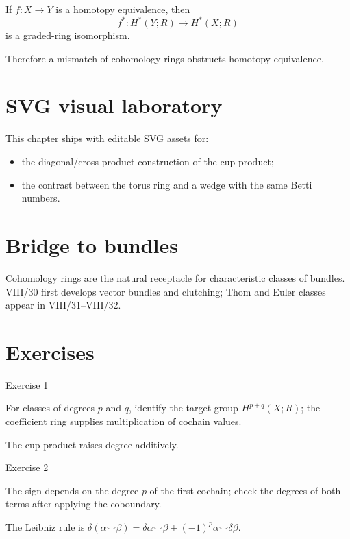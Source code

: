 If \(f:X\to Y\) is a homotopy equivalence, then
\[
f^*:H^*(Y;R)\to H^*(X;R)
\]
is a graded-ring isomorphism.

Therefore a mismatch of cohomology rings obstructs homotopy equivalence.

\section{SVG visual laboratory}

This chapter ships with editable SVG assets for:
\begin{itemize}
\item the diagonal/cross-product construction of the cup product;
\item the contrast between the torus ring and a wedge with the same Betti
numbers.
\end{itemize}

\section{Bridge to bundles}

Cohomology rings are the natural receptacle for characteristic classes of
bundles.  VIII/30 first develops vector bundles and clutching; Thom and Euler
classes appear in VIII/31--VIII/32.


\section{Exercises}

\begin{exercise}\label{exr:viii29-01}
Exercise 1
\end{exercise}
\begin{hint}
For classes of degrees \(p\) and \(q\), identify the target group \(H^{p+q}(X;R)\); the coefficient ring supplies multiplication of cochain values.
\end{hint}
\begin{solution}
The cup product raises degree additively.
\end{solution}

\begin{exercise}\label{exr:viii29-02}
Exercise 2
\end{exercise}
\begin{hint}
The sign depends on the degree \(p\) of the first cochain; check the degrees of both terms after applying the coboundary.
\end{hint}
\begin{solution}
The Leibniz rule is \(\delta(\alpha\smile\beta)=\delta\alpha\smile\beta+(-1)^p\alpha\smile\delta\beta\).
\end{solution}


